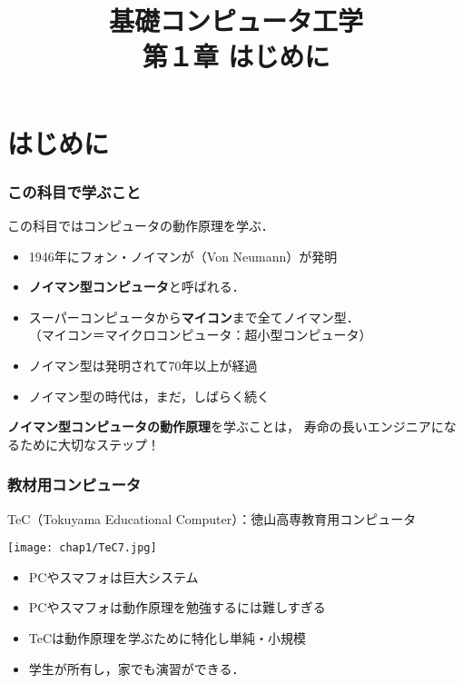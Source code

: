 \documentclass{beamer}                 %
\begin{document}
\title{基礎コンピュータ工学\\第１章 はじめに}
\date{}

\begin{frame}
  \titlepage
\end{frame}


\section{はじめに}
\begin{frame}
  \frametitle{この科目で学ぶこと}
  この科目ではコンピュータの動作原理を学ぶ．
  \vfill
  \begin{itemize}
  \item 1946年にフォン・ノイマンが（Von Neumann）が発明
  \item {\bf ノイマン型コンピュータ}と呼ばれる．
  \item スーパーコンピュータから{\bf マイコン}まで全てノイマン型．\\
    （マイコン＝マイクロコンピュータ：超小型コンピュータ）
  \item ノイマン型は発明されて70年以上が経過
  \item ノイマン型の時代は，まだ，しばらく続く
  \end{itemize}
  \vfill
  {\bf ノイマン型コンピュータの動作原理}を学ぶことは，
  寿命の長いエンジニアになるために大切なステップ！
\end{frame}

\begin{frame}
  \frametitle{教材用コンピュータ}
  TeC（Tokuyama Educational Computer）：徳山高専教育用コンピュータ

  \begin{center}
    \texttt{[image: chap1/TeC7.jpg]}
  \end{center}

  \begin{itemize}
  \item PCやスマフォは巨大システム
  \item PCやスマフォは動作原理を勉強するには難しすぎる
  \item TeCは動作原理を学ぶために特化し単純・小規模
  \item 学生が所有し，家でも演習ができる．
  \end{itemize}
\end{frame}
\end{document}
